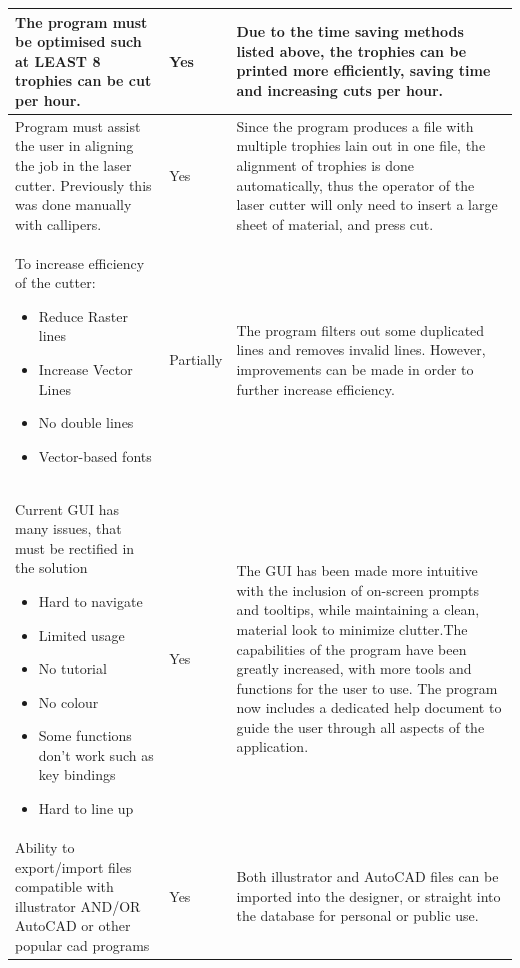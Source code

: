 \documentclass[oneside,openany,11pt,a4paper]{report}
\begin{document}
\begin{longtable}{|p{4cm}|p{2cm}|p{8cm}|}
	The program must be optimised such at LEAST 8 trophies can be cut per hour. &
	Yes &
	Due to the time saving methods listed above, the trophies can be printed more efficiently, saving time and increasing cuts per hour.
	\\ \hline
	
	Program must assist the user in aligning the job in the laser cutter. Previously this was done manually with callipers. &
	Yes &
	Since the program produces a file with multiple trophies lain out in one file, the alignment of trophies is done automatically, thus the operator of the laser cutter will only need to insert a large sheet of material, and press cut.
	\\ \hline
	
	To increase efficiency of the cutter:
	\begin{itemize}
		\itemsep0em
		\item Reduce Raster lines
		\item Increase Vector Lines
		\item No double lines
		\item Vector-based fonts
	\end{itemize} &
	Partially &
	The program filters out some duplicated lines and removes invalid lines. However, improvements can be made in order to further increase efficiency.
	\\ \hline
	
	Current GUI has many issues, that must be rectified in the solution
	\begin{itemize}
		\itemsep0em
		\item Hard to navigate
		\item Limited usage
		\item No tutorial
		\item No colour
		\item Some functions don’t work such as key bindings
		\item Hard to line up
	\end{itemize} & 
	Yes &
	The GUI has been made more intuitive with the inclusion of on-screen prompts and tooltips, while maintaining a clean, material look to minimize clutter.\newline The capabilities of the program have been greatly increased, with more tools and functions for the user to use. The program now includes a dedicated help document to guide the user through all aspects of the application.
	\\ \hline
	Ability to export/import files compatible with illustrator AND/OR AutoCAD or other popular cad programs &
	Yes &
	Both illustrator and AutoCAD files can be imported into the designer, or straight into the database for personal or public use.
	\\ \hline
	

\end{longtable}
\end{document}
